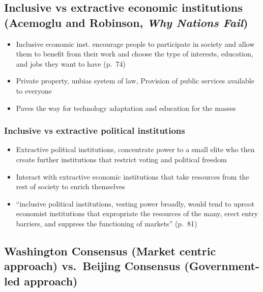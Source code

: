 \documentclass[
]{book}
\begin{document}
\hypertarget{inclusive-vs-extractive-economic-institutions-acemoglu-and-robinson-why-nations-fail}{%
\subsection{\texorpdfstring{Inclusive vs extractive economic institutions (Acemoglu and Robinson, \emph{Why Nations Fail})}{Inclusive vs extractive economic institutions (Acemoglu and Robinson, Why Nations Fail)}}\label{inclusive-vs-extractive-economic-institutions-acemoglu-and-robinson-why-nations-fail}}

\begin{itemize}
\item
  Inclusive economic inst. encourage people to participate in society and allow them to benefit from their work and choose the type of interests, education, and jobs they want to have (p.~74)
\item
  Private property, unbias system of law, Provision of public services available to everyone
\item
  Paves the way for technology adaptation and education for the masses
\end{itemize}

\hypertarget{inclusive-vs-extractive-political-institutions}{%
\subsubsection{Inclusive vs extractive political institutions}\label{inclusive-vs-extractive-political-institutions}}

\begin{itemize}
\item
  Extractive political institutions, concentrate power to a small elite who then create further institutions that restrict voting and political freedom
\item
  Interact with extractive economic institutions that take resources from the rest of society to enrich themselves
\item
  ``inclusive political institutions, vesting power broadly, would tend to uproot economist institutions that expropriate the resources of the many, erect entry barriers, and suppress the functioning of markets'' (p.~81)
\end{itemize}

\hypertarget{washington-consensus-market-centric-approach-vs.-beijing-consensus-government-led-approach}{%
\subsection{Washington Consensus (Market centric approach) vs.~Beijing Consensus (Government-led approach)}\label{washington-consensus-market-centric-approach-vs.-beijing-consensus-government-led-approach}}
\end{document}

